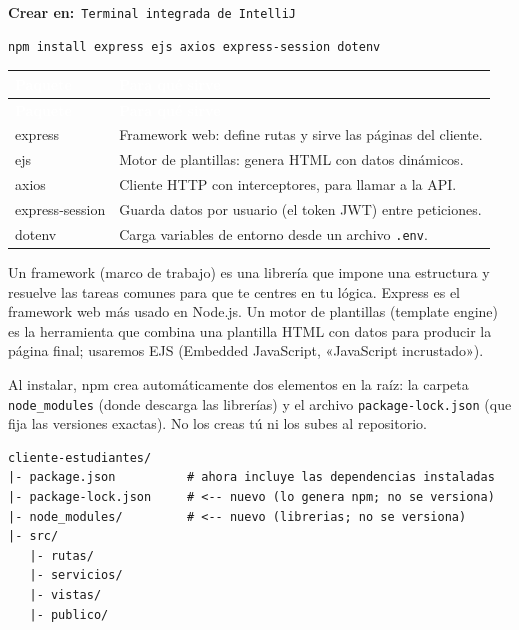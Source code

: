 \documentclass[11pt]{article}
\newcommand{\crearen}[1]{{\small\color{ndverdeo}\textbf{Crear en:}~}\texttt{#1}\par\nobreak\vspace{-1pt}}
\begin{document}
\crearen{Terminal integrada de IntelliJ}
\begin{cajacodigo}
\begin{lstlisting}[style=bash]
npm install express ejs axios express-session dotenv
\end{lstlisting}
\end{cajacodigo}
\vspace{2pt}
{\renewcommand{\arraystretch}{1.25}
\begin{longtable}{>{\raggedright\arraybackslash}p{3.1cm} >{\raggedright\arraybackslash}p{12.3cm}}
\rowcolor{ndverde}\textcolor{white}{\textbf{Paquete}} & \textcolor{white}{\textbf{Para qué sirve}} \\
\endfirsthead
\rowcolor{ndverde}\textcolor{white}{\textbf{Paquete}} & \textcolor{white}{\textbf{Para qué sirve}} \\
\endhead
\ttfamily\color{ndverde}express & Framework web: define rutas y sirve las páginas del cliente. \\ \hline
\ttfamily\color{ndverde}ejs & Motor de plantillas: genera HTML con datos dinámicos. \\ \hline
\ttfamily\color{ndverde}axios & Cliente HTTP con interceptores, para llamar a la API. \\ \hline
\ttfamily\color{ndverde}express-session & Guarda datos por usuario (el token JWT) entre peticiones. \\ \hline
\ttfamily\color{ndverde}dotenv & Carga variables de entorno desde un archivo \texttt{.env}. \\ \hline
\end{longtable}}
Un framework (marco de trabajo) es una librería que impone una estructura y resuelve las tareas comunes para que te centres en tu lógica. Express es el framework web más usado en Node.js. Un motor de plantillas (template engine) es la herramienta que combina una plantilla HTML con datos para producir la página final; usaremos EJS (Embedded JavaScript, «JavaScript incrustado»).

Al instalar, npm crea automáticamente dos elementos en la raíz: la carpeta \texttt{node\_modules} (donde descarga las librerías) y el archivo \texttt{package-lock.json} (que fija las versiones exactas). No los creas tú ni los subes al repositorio.

\begin{cajacodigo}
\begin{lstlisting}[style=markup]
cliente-estudiantes/
|- package.json          # ahora incluye las dependencias instaladas
|- package-lock.json     # <-- nuevo (lo genera npm; no se versiona)
|- node_modules/         # <-- nuevo (librerias; no se versiona)
|- src/
   |- rutas/
   |- servicios/
   |- vistas/
   |- publico/
\end{lstlisting}
\end{cajacodigo}
\vspace{2pt}
\end{document}
